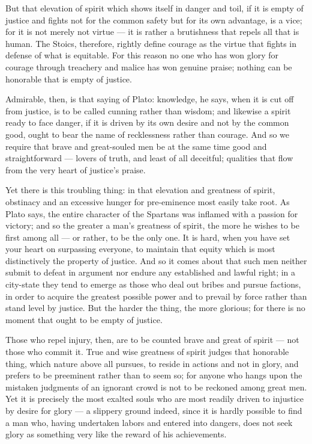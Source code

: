  But that elevation of spirit which shows itself in danger and toil, if it is empty of justice and fights not for the common safety but for its own advantage, is a vice; for it is not merely not virtue — it is rather a brutishness that repels all that is human. The Stoics, therefore, rightly define courage as the virtue that fights in defense of what is equitable. For this reason no one who has won glory for courage through treachery and malice has won genuine praise; nothing can be honorable that is empty of justice.

 Admirable, then, is that saying of Plato: knowledge, he says, when it is cut off from justice, is to be called cunning rather than wisdom; and likewise a spirit ready to face danger, if it is driven by its own desire and not by the common good, ought to bear the name of recklessness rather than courage. And so we require that brave and great-souled men be at the same time good and straightforward — lovers of truth, and least of all deceitful; qualities that flow from the very heart of justice's praise.

 Yet there is this troubling thing: in that elevation and greatness of spirit, obstinacy and an excessive hunger for pre-eminence most easily take root. As Plato says, the entire character of the Spartans was inflamed with a passion for victory; and so the greater a man's greatness of spirit, the more he wishes to be first among all — or rather, to be the only one. It is hard, when you have set your heart on surpassing everyone, to maintain that equity which is most distinctively the property of justice. And so it comes about that such men neither submit to defeat in argument nor endure any established and lawful right; in a city-state they tend to emerge as those who deal out bribes and pursue factions, in order to acquire the greatest possible power and to prevail by force rather than stand level by justice. But the harder the thing, the more glorious; for there is no moment that ought to be empty of justice.

 Those who repel injury, then, are to be counted brave and great of spirit — not those who commit it. True and wise greatness of spirit judges that honorable thing, which nature above all pursues, to reside in actions and not in glory, and prefers to be preeminent rather than to seem so; for anyone who hangs upon the mistaken judgments of an ignorant crowd is not to be reckoned among great men. Yet it is precisely the most exalted souls who are most readily driven to injustice by desire for glory — a slippery ground indeed, since it is hardly possible to find a man who, having undertaken labors and entered into dangers, does not seek glory as something very like the reward of his achievements.

